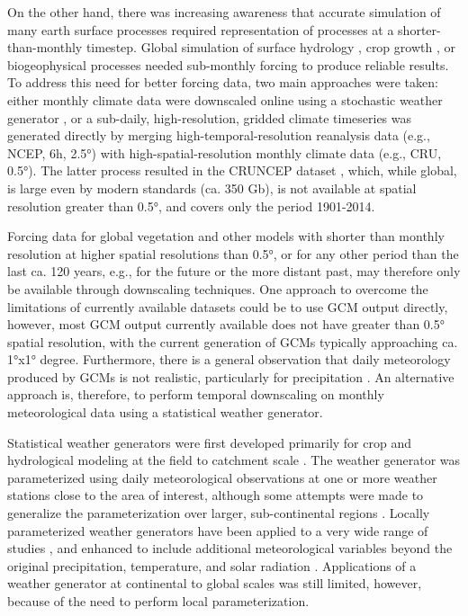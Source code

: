 \begin{refsection}
On the other hand, there was increasing awareness that accurate simulation of many earth surface processes required representation of processes at a shorter-than-monthly timestep. Global simulation of surface hydrology \citep{GertenSchaphoffHaberlandtEtAl2004}, crop growth \citep{BondeauSmithZaehleEtAl2007}, or biogeophysical processes \citep{KrinnerViovyNoblet-DucoudreEtAl2005} needed sub-monthly forcing to produce reliable results. To address this need for better forcing data, two main approaches were taken: either monthly climate data were downscaled online using a stochastic weather generator \citep{PfeifferSpessaKaplan2013}, or a sub-daily, high-resolution, gridded climate timeseries was generated directly by merging high-temporal-resolution reanalysis data (e.g., NCEP, 6h, 2.5°) with high-spatial-resolution monthly climate data (e.g., CRU, 0.5°). The latter process resulted in the CRUNCEP dataset \citep{ViovyCiais2016,WeiLiuHuntzingerEtAl2014}, which, while global, is large even by modern standards (ca. 350 Gb), is not available at spatial resolution greater than 0.5°, and covers only the period 1901-2014.

Forcing data for global vegetation and other models with shorter than monthly resolution at higher spatial resolutions than 0.5°, or for any other period than the last ca. 120 years, e.g., for the future or the more distant past, may therefore only be available through downscaling techniques. One approach to overcome the limitations of currently available datasets could be to use GCM output directly, however, most GCM output currently available does not have greater than 0.5° spatial resolution, with the current generation of GCMs typically approaching ca. 1°x1° degree. Furthermore, there is a general observation that daily meteorology produced by GCMs is not realistic, particularly for precipitation \citep{Dai2006,StephensLEcuyerForbesEtAl2010,SunSolomonDaiEtAl2006}. An alternative approach is, therefore, to perform temporal downscaling on monthly meteorological data using a statistical weather generator.

Statistical weather generators were first developed primarily for crop and hydrological modeling at the field to catchment scale \citep{Richardson1981,WoolhiserPegram1979,WoolhiserRoldan1982}. The weather generator was parameterized using daily meteorological observations at one or more weather stations close to the area of interest, although some attempts were made to generalize the parameterization over larger, sub-continental regions \citep[e.g.][]{Wilks1999a,Wilks1998,WoolhiserRoldan1986}. Locally parameterized weather generators have been applied to a very wide range of studies \citep{Wilks2010,WilksWilby1999}, and enhanced to include additional meteorological variables beyond the original precipitation, temperature, and solar radiation \citep[e.g.][]{ParlangeKatz2000}. Applications of a weather generator at continental to global scales was still limited, however, because of the need to perform local parameterization.


\end{refsection}
